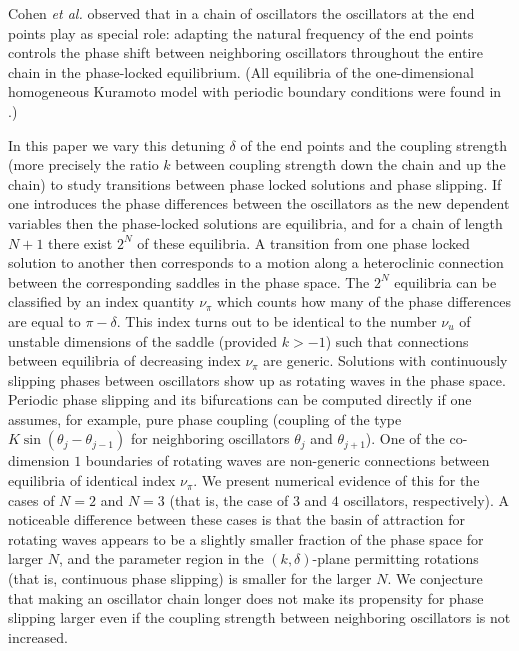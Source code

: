 \documentclass[aps,pre,twocolumn,a4paper,showkeys,showpacs]{revtex4}\usepackage{color}
\theoremstyle{plain}
\theoremstyle{plain}
\begin{document}
Cohen \emph{et al.} \cite{cohen1982ncs} observed that in a chain of
oscillators the oscillators at the end points play as special role:
adapting the natural frequency of the end points controls the phase
shift between neighboring oscillators throughout the entire chain in
the phase-locked equilibrium. (All equilibria of the one-dimensional
homogeneous Kuramoto model with periodic boundary conditions were
found in \cite{mehta2011stationary}.)

In this paper we vary this detuning $\delta$ of the end points and the
coupling strength (more precisely the ratio $k$ between coupling strength down
the chain and up the chain) to study transitions between phase locked
solutions and phase slipping. If one introduces the phase differences between
the oscillators as the new dependent variables then the phase-locked solutions
are equilibria, and for a chain of length $N+1$ there exist $2^{N}$ of these
equilibria. A transition from one phase locked solution to another then
corresponds to a motion along a heteroclinic connection between the
corresponding saddles in the phase space. The $2^{N}$ equilibria can be
classified by an index quantity $\nu_{\pi}$ which counts how many of the phase
differences are equal to $\pi-\delta$. This index turns out to be identical to
the number $\nu_{u}$ of unstable dimensions of the saddle (provided $k>-1$)
such that connections between equilibria of decreasing index $\nu_{\pi}$ are
generic. Solutions with continuously slipping phases between oscillators show
up as rotating waves in the phase space. Periodic phase slipping and its
bifurcations can be computed directly if one assumes, for example, pure phase
coupling (coupling of the type $K\sin(\theta_{j}-\theta_{j-1})$ for
neighboring oscillators $\theta_{j}$ and $\theta_{j+1}$). One of the
co-dimension $1$ boundaries of rotating waves are non-generic connections
between equilibria of identical index $\nu_{\pi}$. We present numerical
evidence of this for the cases of $N=2$ and $N=3$ (that is, the case of $3$
and $4$ oscillators, respectively). A noticeable difference between these
cases is that the basin of attraction for rotating waves appears to be a
slightly smaller fraction of the phase space for larger $N$, and the parameter
region in the $(k,\delta)$-plane permitting rotations (that is, continuous
phase slipping) is smaller for the larger $N$. We conjecture that making an
oscillator chain longer does not make its propensity for phase slipping larger
even if the coupling strength between neighboring oscillators is not increased.
\end{document}
